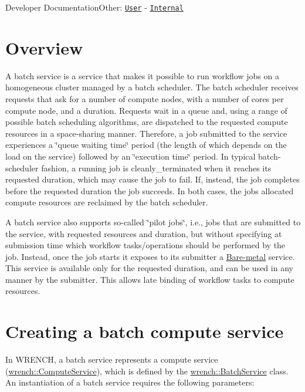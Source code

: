 Developer DocumentationOther\+: \href{../user/guide-batch.html}{\tt User} -\/ \href{../internal/guide-batch.html}{\tt Internal}\hypertarget{guide-batch_guide-batch-overview}{}\section{Overview}\label{guide-batch_guide-batch-overview}
A batch service is a service that makes it possible to run workflow jobs on a homogeneous cluster managed by a batch scheduler. The batch scheduler receives requests that ask for a number of compute nodes, with a number of cores per compute node, and a duration. Requests wait in a queue and, using a range of possible batch scheduling algorithms, are dispatched to the requested compute resources in a space-\/sharing manner. Therefore, a job submitted to the service experiences a \char`\"{}queue waiting time\char`\"{} period (the length of which depends on the load on the service) followed by an \char`\"{}execution time\char`\"{} period. In typical batch-\/scheduler fashion, a running job is cleanly\+\_\+terminated when it reaches its requested duration, which may cause the job to fail. If, instead, the job completes before the requested duration the job succeeds. In both cases, the job\textquotesingle{}s allocated compute resources are reclaimed by the batch scheduler.

A batch service also supports so-\/called \char`\"{}pilot jobs\char`\"{}, i.\+e., jobs that are submitted to the service, with requested resources and duration, but without specifying at submission time which workflow tasks/operations should be performed by the job. Instead, once the job starts it exposes to its submitter a \hyperlink{guide-baremetal}{Bare-\/metal} service. This service is available only for the requested duration, and can be used in any manner by the submitter. This allows late binding of workflow tasks to compute resources.\hypertarget{guide-batch_guide-batch-creating}{}\section{Creating a batch compute service}\label{guide-batch_guide-batch-creating}
In W\+R\+E\+N\+CH, a batch service represents a compute service ({\ttfamily \hyperlink{classwrench_1_1_compute_service}{wrench\+::\+Compute\+Service}}), which is defined by the {\ttfamily \hyperlink{classwrench_1_1_batch_service}{wrench\+::\+Batch\+Service}} class. An instantiation of a batch service requires the following parameters\+:


